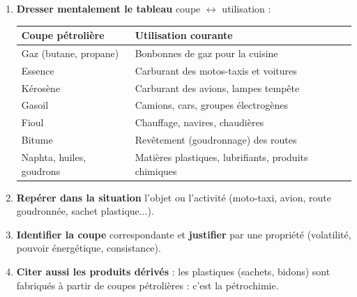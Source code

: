 \documentclass[11pt]{article}
\newcommand{\cle}[1]{{\popxbold\color{popdark}#1}}
\begin{document}
\begin{methode}
\begin{enumerate}
\item \textbf{Dresser mentalement le tableau} coupe $\leftrightarrow$ utilisation :
\begin{center}
\begin{tabularx}{\linewidth}{|l|X|}\hline
\rowcolor{popblueL} \textbf{Coupe pétrolière} & \textbf{Utilisation courante} \\ \hline
Gaz (butane, propane) & Bonbonnes de gaz pour la cuisine \\ \hline
Essence & Carburant des motos-taxis et voitures \\ \hline
Kérosène & Carburant des avions, lampes tempête \\ \hline
Gasoil & Camions, cars, groupes électrogènes \\ \hline
Fioul & Chauffage, navires, chaudières \\ \hline
Bitume & Revêtement (goudronnage) des routes \\ \hline
Naphta, huiles, goudrons & Matières plastiques, lubrifiants, produits chimiques \\ \hline
\end{tabularx}
\end{center}
\item \textbf{Repérer dans la situation} l'objet ou l'activité (moto-taxi, avion, route goudronnée, sachet plastique...).
\item \textbf{Identifier la coupe} correspondante et \textbf{justifier} par une propriété (volatilité, pouvoir énergétique, consistance).
\item \textbf{Citer aussi les produits dérivés} : les plastiques (sachets, bidons) sont fabriqués à partir de coupes pétrolières : c'est la \cle{pétrochimie}.
\end{enumerate}
\end{methode}
\end{document}
